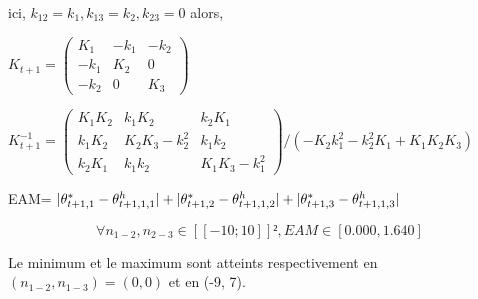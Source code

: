 ici, $k_{12}=k_1, k_{13}=k_2, k_{23}=0$
alors, 

$ K_{t+1}= \begin{pmatrix}
K_1&-k_1&-k_2\\
-k_1&K_2&0\\
-k_2&0&K_3
\end{pmatrix}$

$ K^{-1}_{t+1}= \left( \begin{array}{ccc} K_1 K_2 & k_1 K_2 & k_2 K_1 \\ k_1 K_2 & K_2 K_3-k_2^2 & k_1 k_2 \\ k_2 K_1 & k_1 k_2 & K_1 K_3-k_1^2 \end{array} \right)/(-K_2 k_1^2-k_2^2 K_1+K_1 K_2 K_3)$

EAM=  $|\theta^*_{t+1,1} - \theta^h_{t+1,1,1}|   +  |\theta^*_{t+1,2} - \theta^h_{t+1,1,2}|  +  |\theta^*_{t+1,3} - \theta^h_{t+1,1,3}|  $



\begin{equation*}
\forall{n_{1-2},n_{2-3}}\in [\![-10;10]\!]²,  EAM \in [0.000,1.640 ]
\end{equation*}


Le minimum et le maximum sont atteints respectivement en $(n_{1-2},n_{1-3})=(0, 0)$ et en (-9, 7).
